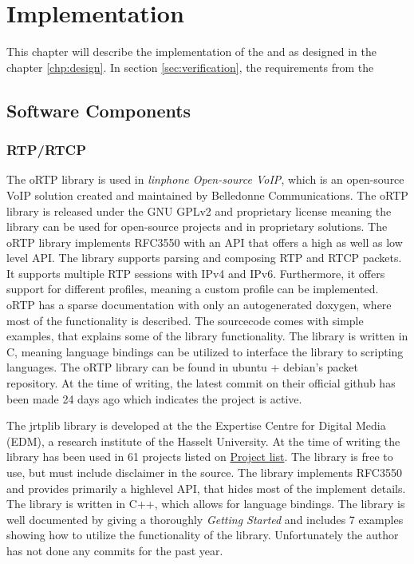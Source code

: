 \chapter{Implementation} \label{chp:implementation}
This chapter will describe the implementation of the \pub{} and \sub{} as designed in the chapter \ref{chp:design}. In section \ref{sec:verification}, the requirements from the 

\section{Software Components}
\subsection{RTP/RTCP}

The oRTP library is used in \textit{linphone Open-source VoIP}, which is an open-source VoIP solution created and maintained by Belledonne Communications. The oRTP library is released under the GNU GPLv2 and proprietary license meaning the library can be used for open-source projects and in proprietary solutions.
The oRTP library implements RFC3550 with an API that offers a high as well as low level API. The library supports parsing and composing RTP and RTCP packets. It supports multiple RTP sessions with IPv4 and IPv6. Furthermore, it offers support for different profiles, meaning a custom profile can be implemented.  oRTP has a sparse documentation with only an autogenerated doxygen, where most of the functionality is described. The sourcecode comes with simple examples, that explains some of the library functionality. The library is written in C, meaning language bindings can be utilized to interface the library to scripting languages. The oRTP library can be found in ubuntu + debian's packet repository. At the time of writing, the latest commit on their official github has been made 24 days ago which indicates the project is active.

The jrtplib library is developed at the the Expertise Centre for Digital Media (EDM), a research institute of the Hasselt University. At the time of writing the library has been used in 61 projects listed on \href{http://research.edm.uhasselt.be/jori/cgi-bin/listprojects.py?name=jrtplib}{Project list}. The library is free to use, but must include disclaimer in the source. The library implements RFC3550 and provides primarily a highlevel API, that hides most of the implement details. The library is written in C++, which allows for language bindings. The library is  well documented by giving a thoroughly \textit{Getting Started} and includes 7 examples showing how to utilize the functionality of the library. Unfortunately the author has not done any commits for the past year.

